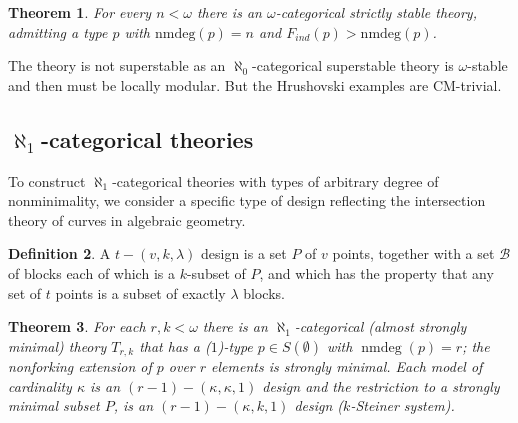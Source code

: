 \documentclass[11pt]{amsart}
\def\BB{\mathcal{B}}
\def\nmdeg{\mathop{\rm nmdeg}}
\newcommand{\sidebar}[1]{\vskip10pt\noindent
 \hskip.70truein\vrule width2.0pt\hskip.5em
 \vbox{\hsize= 4truein\noindent\footnotesize\relax #1 }\vskip10pt\noindent}
\def\nmdeg{\operatorname{nmdeg}}
\newtheorem{theorem}{Theorem}[section]
\theoremstyle{definition}
\newtheorem{definition}[theorem]{Definition}
\theoremstyle{remark}
\numberwithin{equation}{section}
\begin{document}
\begin{theorem} For every $n< \omega$ there is an $\omega$-categorical strictly stable theory,
 admitting a type $p$ with $\mathrm{nmdeg}(p) = n$ and $F_{ind}(p) > \mathrm{nmdeg}(p)$.
\end{theorem}

The theory is not superstable as an $\aleph_0$-categorical superstable theory
is $\omega$-stable and then must be locally modular. But the Hrushovski
examples are CM-trivial.








%
%

\subsection{$\aleph_1$-categorical theories} \label{nm1cat}

To construct $\aleph_1$-categorical theories with types of arbitrary degree of nonminimality, we consider
a specific type of design reflecting the intersection theory of curves in algebraic geometry.

\begin{definition}\label{design}  A $t-(v, k,\lambda)$ design is a set $P$ of $v$ points,
together with a set $\BB$ of blocks each of which is a $k$-subset of $P$, and
which has the property that any set of $t$ points is a subset of exactly
$\lambda$ blocks.
\end{definition}




\begin{theorem}\label{asmthm} For each $r,k< \omega$ there is an
$\aleph_1$-categorical (almost strongly minimal) theory $T_{r,k}$
that has a  ($1$)-type $p\in S(\emptyset)$ with $\nmdeg(p) =r$; the
nonforking extension of $p$ over $r$ elements is strongly minimal. Each model
of cardinality $\kappa$ is an $(r-1) -(\kappa,\kappa,1)$ design and the
restriction to a strongly minimal subset $P$, is an $(r-1) - (\kappa,k,1)$ design
($k$-Steiner system).
\end{theorem}
\end{document}
